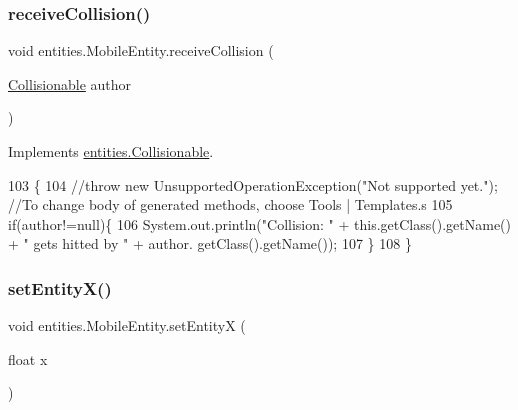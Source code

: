 \mbox{\label{classentities_1_1_mobile_entity_a84c8b17b0285f2ed67edadb70e1db80b}} 
\subsubsection{\texorpdfstring{receive\+Collision()}{receiveCollision()}}
{\footnotesize\ttfamily void entities.\+Mobile\+Entity.\+receive\+Collision (\begin{DoxyParamCaption}\item[{\mbox{\hyperlink{interfaceentities_1_1_collisionable}{Collisionable}}}]{author }\end{DoxyParamCaption})\hspace{0.3cm}{\ttfamily [inline]}}



Implements \mbox{\hyperlink{interfaceentities_1_1_collisionable_a956a85182fef376af333622e844342e3}{entities.\+Collisionable}}.


\begin{DoxyCode}
103                                                        \{
104         \textcolor{comment}{//throw new UnsupportedOperationException("Not supported yet."); //To change body of generated
       methods, choose Tools | Templates.s}
105         \textcolor{keywordflow}{if}(author!=null)\{
106             System.out.println(\textcolor{stringliteral}{"Collision: "} + this.getClass().getName() + \textcolor{stringliteral}{" gets hitted by "} + author.
      getClass().getName());
107         \}
108     \}
\end{DoxyCode}
\mbox{\label{classentities_1_1_mobile_entity_a99e4a1603aabaaf21c91ffad2e0d86cf}} 
\subsubsection{\texorpdfstring{set\+Entity\+X()}{setEntityX()}}
{\footnotesize\ttfamily void entities.\+Mobile\+Entity.\+set\+EntityX (\begin{DoxyParamCaption}\item[{float}]{x }\end{DoxyParamCaption})\hspace{0.3cm}{\ttfamily [inline]}}


